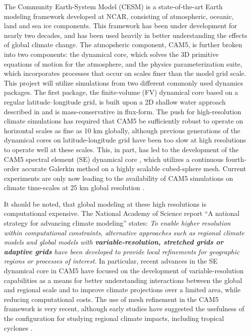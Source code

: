 \documentclass[11pt]{article}
\begin{document}
The Community Earth-System Model (CESM) \citep{RBNetal2010NCAR} is a state-of-the-art Earth modeling framework developed at NCAR, consisting of atmospheric, oceanic, land and sea ice components.  This framework has been under development for nearly two decades, and has been used heavily in better understanding the effects of global climate change.  The atmopsheric component, CAM5, is further broken into two components: the dynamical core, which solves the 3D primitive equations of motion for the atmosphere, and the physics parameterization suite, which incorporates processes that occur on scales finer than the model grid scale. This project will utilize simulations from two different commonly used dynamics packages. The first package, the finite-volume (FV) dynamical core based on a regular latitude--longitude grid, is built upon a 2D shallow water approach described in \citet{Lin1996,Lin1997} and is mass-conservative in flux-form. The push for high-resolution climate simulations has required that CAM5 be sufficiently robust to operate on horizontal scales as fine as 10 km globally, although previous generations of the dynamical cores on latitude-longitude grid have been too slow at high resolutions to operate well at these scales.  This, in part, has led to the development of the CAM5 spectral element (SE) dynamical core \citep{dennis2012cam}, which utilizes a continuous fourth-order accurate Galerkin method on a highly scalable cubed-sphere mesh.  Current experiments are only now leading to the availability of CAM5 simulations on climate time-scales at 25 km global resolution \citep{Bacmeister2014, Wehner2014, Wehner2015, Reed2015b}.

It should be noted, that global modeling at these high resolutions is computational expensive.  The National Academy of Science report ``A national strategy for advancing climate modeling'' states: \textit{To enable higher resolution within computational constraints, alternative approaches such as regional climate models and global models with \textbf{variable-resolution, stretched grids or adaptive grids} have been developed to provide local refinements for geographic regions or processes of interest.}  In particular, recent advances in the SE dynamical core in CAM5 have focused on the development of variable-resolution capabilities as a means for better understanding interactions between the global and regional scale and to improve climate projections over a limited area, while reducing computational costs. The use of mesh refinement in the CAM5 framework is very recent, although early studies have suggested the usefulness of the configuration for studying regional climate impacts, including tropical cyclones \citep{Zarzycki2014multidecadal, Zarzycki2015clim}.
\end{document}
